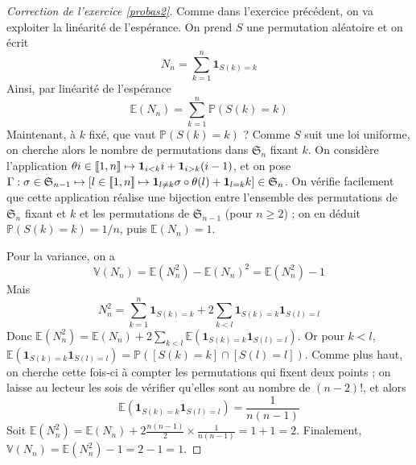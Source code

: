 \begin{proof}[Correction de l'exercice \ref{probas2}]
    Comme dans l'exercice précédent, on va exploiter la linéarité de l'espérance. 
    On prend $S$ une permutation aléatoire et on écrit 
    \[
        N_n=\sum_{k=1}^n\mathbf1_{S(k)=k}
    \]
    Ainsi, par linéarité de l'espérance
    \[
        \mathbb E(N_n)=\sum_{k=1}^n \mathbb P(S(k)=k)
    \]
    Maintenant, à $k$ fixé, que vaut $\mathbb P(S(k)=k)$ ?
    Comme $S$ suit une loi uniforme, on cherche alors le nombre de permutations dans $\mathfrak S_n$ fixant $k$. 
    On considère l'application $\theta i\in[\![1,n]\!]\mapsto \mathbf1_{i<k}i+\mathbf1_{i > k}(i-1)$, et on pose 
    $\Gamma : \sigma \in \mathfrak S_{n-1}\mapsto [l\in[\![1,n]\!]\mapsto \mathbf1_{l\neq k}\sigma\circ\theta(l)+\mathbf1_{l=k}k]\in\mathfrak S_n$.
    On vérifie facilement que cette application réalise une bijection entre l'ensemble des permutations de $\mathfrak S_n$ fixant et $k$ et les permutations de $\mathfrak S_{n-1}$
    (pour $n\geq 2$) ; on en déduit $\mathbb P(S(k)=k)=1/n$, puis $\mathbb E(N_n)=1$.

    Pour la variance, on a 
    \[
        \mathbb V(N_n)=\mathbb E(N_n^2)-\mathbb E(N_n)^2=\mathbb E(N_n^2)-1
    \]
    Mais 
    \[
        N_n^2=\sum_{k=1}^n\mathbf1_{S(k)=k}+2\sum_{k<l}\mathbf1_{S(k)=k}\mathbf1_{S(l)=l}
    \]
    Donc $\mathbb E(N_n^2)=\mathbb E(N_n)+2\sum_{k<l}\mathbb E(\mathbf1_{S(k)=k}\mathbf1_{S(l)=l})$.
    Or pour $k<l$, $\mathbb E(\mathbf1_{S(k)=k}\mathbf1_{S(l)=l})=\mathbb P([S(k)=k]\cap[S(l)=l])$.
    Comme plus haut, on cherche cette fois-ci à compter les permutations qui fixent deux points ; on laisse 
    au lecteur les sois de vérifier qu'elles sont au nombre de $(n-2)!$, et alors 
    \[
        \mathbb E(\mathbf1_{S(k)=k}\mathbf1_{S(l)=l})=\frac1{n(n-1)}
    \]
    Soit $\mathbb E(N_n^2)=\mathbb E(N_n)+2\frac{n(n-1)}2\times\frac1{n(n-1)}=1+1=2$.
    Finalement, $\mathbb V(N_n)=\mathbb E(N_n^2)-1=2-1=1$.

\end{proof}
